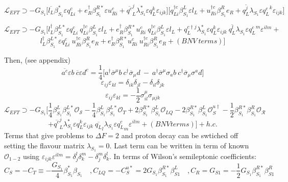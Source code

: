 \documentclass{article}
\begin{document}
\[
\mathcal{L}_{EFT} \supset -G_{S_1} \big[ \overline{l_L} \beta^*_{S_1} \varepsilon q^c_{L i} +  e^\dagger_{R} \beta^{R*}_{S_1} \varepsilon u^c_{R i} + \overline{q^c}_L^j \lambda_{S_1}^* \varepsilon q^k_L \varepsilon_{ijk}\big] \big[ q^{\dagger c}_{L i} \beta^L_{S_1} \varepsilon l_L + u^{\dagger c}_{R i} \beta^R_{S_1}  e_R + \overline{q^j_L} \lambda_{S_1} \varepsilon {q^{c}_L}^k \varepsilon_{ijk} \big]
\]

\[
\mathcal{L}_{EFT} \supset -G_{S_1} \big[ l^\dagger_L \beta^{L*}_{S_1} \varepsilon q^c_{L i} \ q^{\dagger c}_{L i} \beta^L_{S_1} \varepsilon l_L + 
e^\dagger_{R} \beta^{R*}_{S_1} u^c_{R i} \ q^{\dagger c}_{L i} \beta^L_{S_1} \varepsilon l_L + 
q^{c\dagger j}_L \lambda_{S_1}^* \varepsilon q^k_L \varepsilon_{ijk} \ \overline{q^l_L} \lambda_{S_1} \varepsilon {q^{c}_L}^m \varepsilon^{ilm} + 
\]
\[
 l^\dagger_L \beta^{L*}_{S_1} \varepsilon q^c_{L i} \ u^{\dagger c}_{R i} \beta^R_{S_1}  e_R +
e^\dagger_{R } \beta^{R*}_{S_1} u^c_{R i} \ u^{\dagger c}_{R i} \beta^R_{S_1}  e_R+ (BNV \ terms) 
\big] 
\]


Then, (see appendix)
\[
\overline{a^c} \varepsilon b \  \overline{c} \varepsilon d^c =\frac{1}{4}\big[ a^\dagger \overline{\sigma}^ \mu b \ c^\dagger \overline{\sigma}_\mu d \ - \ a^\dagger \overline{\sigma}^\mu  \sigma_a b \ c^\dagger \overline{\sigma}_\mu  \sigma^a d \big] 
\]
\[
\varepsilon_{ij} \varepsilon_{kl}= \delta_{ik} \delta_{jl} - \delta_{il} \delta_{jk}
\]
\[
\varepsilon_{ij} \varepsilon_{kl}= - \frac{1}{2} \sigma^\mu_{il} \sigma_{\mu jk}
\]
\[
\mathcal{L}_{EFT} \supset -G_{S_1} \big[ \frac{1}{4} \beta^L_{S_1} \beta_{S_1}^{L*} \mathcal{O_S} - \frac{1}{4} \beta^L_{S_1} \beta_{S_1}^{L*} \mathcal{O}_T +  2\beta^{R*}_{S_1} \beta^L_{S_1} \mathcal{O}_{LQ} - 2\beta^{R*}_{S_1} \beta^L_{S_1} \mathcal{O}_{S}^{u \dagger}   - \frac{1}{2} \beta^{R*}_{S_1} \beta^R_{S_1} \mathcal{O_R} 
\]
\[
+ \overline{q^c}_L^j \lambda_{S_1}^* \varepsilon q^k_L \varepsilon_{ijk} \ \overline{q_L}_l \lambda_{S_1} \varepsilon {q^c_L}_m \varepsilon^{ilm} + (BNV terms) \big] +h.c.
\]
Terms that give problems to $\Delta F=2$ and proton decay can be swtiched off setting the flavour matrix $\lambda_{S_1}=0$. Last term can be written in term of known $\mathcal{O}_{1-2}$ using $\varepsilon_{ijk} \varepsilon^{ilm} = \delta_j^l \delta_k^m -\delta_j^m \delta_k^l $.
In terms of Wilson's semileptonic coefficients:
\[
C_S = - C_T \equiv - \frac{G_{S_1}}{4}\beta^*_{S_1} \beta_{S_1} \quad, C_{LQ}=-C_S^{u*}= 2G_{S_1} \beta^{R*}_{S_1} \beta^L_{S1} \quad, C_R = G_{S1} = - \frac{1}{2} G_{S_1} \beta_{S_1}^{R*} \beta^R_{S1} 
\]
\end{document}
